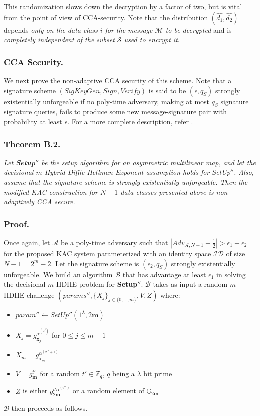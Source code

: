 \noindent This randomization slows down the decryption by a factor of two, but is vital from the point of view of CCA-security. Note that the distribution $(\hat{d_1},\hat{d_2})$ depends \emph{only on the data class $i$ for the message $\mathcal{M}$ to be decrypted} and is \emph{completely independent of the subset $\mathcal{S}$ used to encrypt it}. 

\subsubsection{CCA Security.} We next prove the non-adaptive CCA security of this scheme. Note that a signature scheme $(SigKeyGen,Sign,Verify)$ is said to be $(\epsilon,q_S)$ strongly existentially unforgeable if no poly-time adversary, making at most $q_{S}$ signature signature queries, fails to produce some new message-signature pair with probability at least $\epsilon$. For a more complete description, refer \cite{canetti2004chosen}.

\subsubsection{Theorem B.2.} \textit{Let \textbf{Setup}$''$ be the setup algorithm for an asymmetric multilinear map, and let the decisional $m$-Hybrid Diffie-Hellman Exponent assumption holds for {SetUp}$''$. Also, assume that the signature scheme is strongly existentially unforgeable. Then the modified KAC construction for $N-1$ data classes presented above is non-adaptively CCA secure.}

\subsubsection{Proof.} Once again, let $\mathcal{A}$ be a poly-time adversary such that $|Adv_{\mathcal{A},N-1}-\frac{1}{2}| > \epsilon_1+\epsilon_2$ for the proposed KAC system parameterized with an identity space $\mathcal{ID}$ of size $N-1=2^m-2$. Let the signature scheme is $(\epsilon_2,q_S)$ strongly existentially unforgeable. We build an algorithm $\mathcal{B}$ that has advantage at least $\epsilon_1$ in solving the decisional $m$-HDHE problem for \textbf{Setup}$''$. $\mathcal{B}$ takes as input a random $m$-HDHE challenge $(params'',\{X_j\}_{j\in\{0,\cdots,m\}},V,Z)$ where:
\begin{itemize}
 \item $param''\leftarrow SetUp''(1^{\lambda},2\mathbf{m})$ 
 \item $X_j=g^{\alpha^{(2^j)}}_{\mathbf{x}_j}$ for $0\leq j \leq m-1$
 \item $X_m=g^{\alpha^{(2^m+1)}}_{\mathbf{x}_m}$
 \item $V=g^{t'}_{\mathbf{m}}$ for a random $t'\in\mathbb{Z}_q$, $q$ being a $\lambda$ bit prime
 \item $Z$ is either $g^{t'\alpha^{(2^m)}}_{2\mathbf{m}}$ or a random element of $\mathbb{G}_{2\mathbf{m}}$
\end{itemize}
\noindent $\mathcal{B}$ then proceeds as follows.\\


